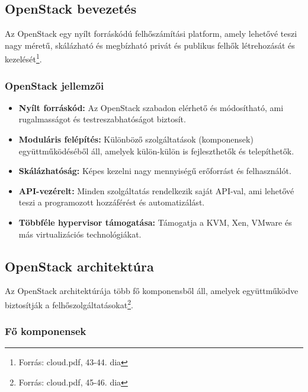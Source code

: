 \documentclass[a4paper,12pt]{article}
\begin{document}
    \subsection{OpenStack bevezetés}

    Az OpenStack egy nyílt forráskódú felhőszámítási platform, amely lehetővé teszi nagy méretű, skálázható és megbízható privát és publikus felhők létrehozását és kezelését\footnote{Forrás: cloud.pdf, 43-44. dia}.

    \subsubsection{OpenStack jellemzői}

    \begin{itemize}
        \item \textbf{Nyílt forráskód:} Az OpenStack szabadon elérhető és módosítható, ami rugalmasságot és testreszabhatóságot biztosít.
        \item \textbf{Moduláris felépítés:} Különböző szolgáltatások (komponensek) együttműködéséből áll, amelyek külön-külön is fejleszthetők és telepíthetők.
        \item \textbf{Skálázhatóság:} Képes kezelni nagy mennyiségű erőforrást és felhasználót.
        \item \textbf{API-vezérelt:} Minden szolgáltatás rendelkezik saját API-val, ami lehetővé teszi a programozott hozzáférést és automatizálást.
        \item \textbf{Többféle hypervisor támogatása:} Támogatja a KVM, Xen, VMware és más virtualizációs technológiákat.
    \end{itemize}

    \subsection{OpenStack architektúra}

    Az OpenStack architektúrája több fő komponensből áll, amelyek együttműködve biztosítják a felhőszolgáltatásokat\footnote{Forrás: cloud.pdf, 45-46. dia}.

    \subsubsection{Fő komponensek}
\end{document}
